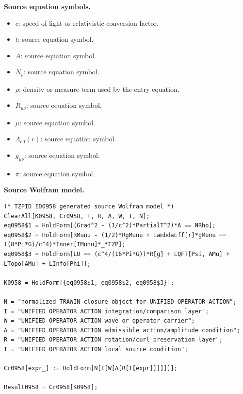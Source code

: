 \begin{minipage}[t]{0.49\linewidth}
\begingroup
\small
\raggedright
\textbf{Source equation symbols.}\par
\begin{itemize}[leftmargin=1.35em,itemsep=1pt,topsep=1pt,parsep=0pt]
    \item $c$: speed of light or relativistic conversion factor.
    \item $t$: source equation symbol.
    \item $A$: source equation symbol.
    \item $N_{\rho}$: source equation symbol.
    \item $\rho$: density or measure term used by the entry equation.
    \item $R_{\mu\nu}$: source equation symbol.
    \item $\mu$: source equation symbol.
    \item $\Lambda_{\mathrm{eff}}(r)$: source equation symbol.
    \item $g_{\mu\nu}$: source equation symbol.
    \item $\pi$: source equation symbol.
\end{itemize}
\endgroup
\end{minipage}\hfill
\begin{minipage}[t]{0.47\linewidth}
\begingroup
\scriptsize
\raggedright
\textbf{Source Wolfram model.}\par
\begin{Verbatim}[fontsize=\tiny,breaklines=true,breakanywhere=true]
(* TZPID ID0958 generated source Wolfram model *)
ClearAll[K0958, Cr0958, T, R, A, W, I, N];
eq0958$1 = HoldForm[(Grad^2 - (1/c^2)*PartialT^2)*A == NRho];
eq0958$2 = HoldForm[RMunu - (1/2)*RgMunu + LambdaEff[r]*gMunu == ((8*Pi*G)/c^4)*Inner[TMunu]*_*TZP];
eq0958$3 = HoldForm[LU == (c^4/(16*Pi*G))*R[g] + LQFT[Psi, AMu] + LTopo[AMu] + LInfo[Phi]];

K0958 = HoldForm[{eq0958$1, eq0958$2, eq0958$3}];

N = "normalized TRAWIN closure object for UNIFIED OPERATOR ACTION";
I = "UNIFIED OPERATOR ACTION integration/comparison layer";
W = "UNIFIED OPERATOR ACTION wave or operator carrier";
A = "UNIFIED OPERATOR ACTION admissible action/amplitude condition";
R = "UNIFIED OPERATOR ACTION rotation/curl preservation layer";
T = "UNIFIED OPERATOR ACTION local source condition";

Cr0958[expr_] := HoldForm[N[I[W[A[R[T[expr]]]]]]];

Result0958 = Cr0958[K0958];
\end{Verbatim}
\endgroup
\end{minipage}

